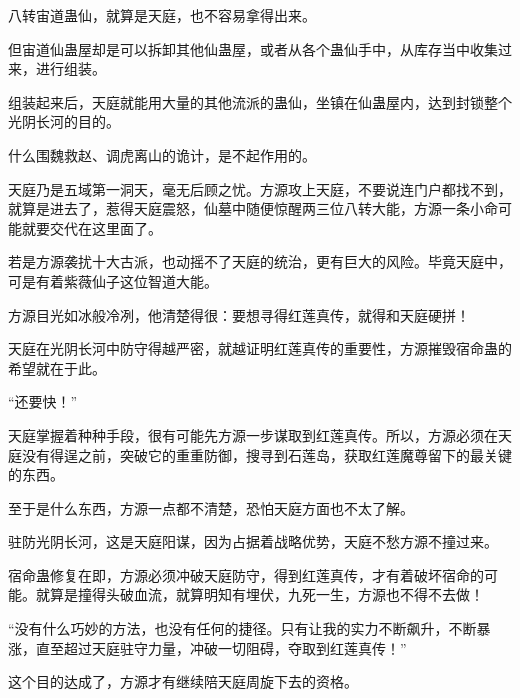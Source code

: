 \begin{this_body}
八转宙道蛊仙，就算是天庭，也不容易拿得出来。

但宙道仙蛊屋却是可以拆卸其他仙蛊屋，或者从各个蛊仙手中，从库存当中收集过来，进行组装。

组装起来后，天庭就能用大量的其他流派的蛊仙，坐镇在仙蛊屋内，达到封锁整个光阴长河的目的。

什么围魏救赵、调虎离山的诡计，是不起作用的。

天庭乃是五域第一洞天，毫无后顾之忧。方源攻上天庭，不要说连门户都找不到，就算是进去了，惹得天庭震怒，仙墓中随便惊醒两三位八转大能，方源一条小命可能就要交代在这里面了。

若是方源袭扰十大古派，也动摇不了天庭的统治，更有巨大的风险。毕竟天庭中，可是有着紫薇仙子这位智道大能。

方源目光如冰般冷冽，他清楚得很：要想寻得红莲真传，就得和天庭硬拼！

天庭在光阴长河中防守得越严密，就越证明红莲真传的重要性，方源摧毁宿命蛊的希望就在于此。

“还要快！”

天庭掌握着种种手段，很有可能先方源一步谋取到红莲真传。所以，方源必须在天庭没有得逞之前，突破它的重重防御，搜寻到石莲岛，获取红莲魔尊留下的最关键的东西。

至于是什么东西，方源一点都不清楚，恐怕天庭方面也不太了解。

驻防光阴长河，这是天庭阳谋，因为占据着战略优势，天庭不愁方源不撞过来。

宿命蛊修复在即，方源必须冲破天庭防守，得到红莲真传，才有着破坏宿命的可能。就算是撞得头破血流，就算明知有埋伏，九死一生，方源也不得不去做！

“没有什么巧妙的方法，也没有任何的捷径。只有让我的实力不断飙升，不断暴涨，直至超过天庭驻守力量，冲破一切阻碍，夺取到红莲真传！”

这个目的达成了，方源才有继续陪天庭周旋下去的资格。

\end{this_body}


